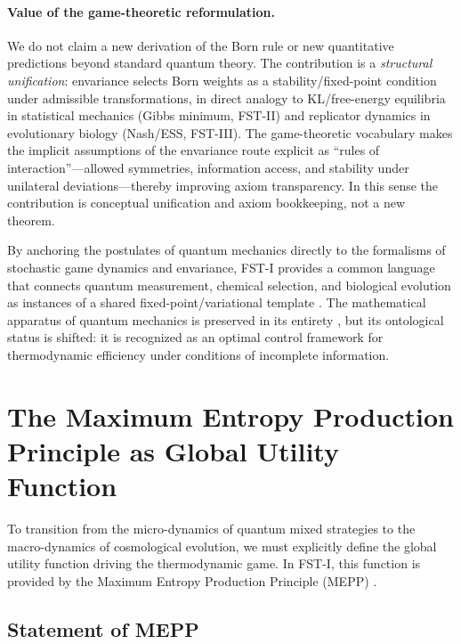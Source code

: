 \documentclass[12pt,a4paper]{article}
\theoremstyle{remark}
\begin{document}
\paragraph{Value of the game-theoretic reformulation.}
We do not claim a new derivation of the Born rule or new quantitative predictions beyond standard quantum theory. The contribution is a \emph{structural unification}: envariance selects Born weights as a stability/fixed-point condition under admissible transformations, in direct analogy to KL/free-energy equilibria in statistical mechanics (Gibbs minimum, FST-II) and replicator dynamics in evolutionary biology (Nash/ESS, FST-III). The game-theoretic vocabulary makes the implicit assumptions of the envariance route explicit as ``rules of interaction''---allowed symmetries, information access, and stability under unilateral deviations---thereby improving axiom transparency. In this sense the contribution is conceptual unification and axiom bookkeeping, not a new theorem.

By anchoring the postulates of quantum mechanics directly to the formalisms of stochastic game dynamics and envariance, FST-I provides a common language that connects quantum measurement, chemical selection, and biological evolution as instances of a shared fixed-point/variational template \citep{SchlossFine2005}. The mathematical apparatus of quantum mechanics is preserved in its entirety \citep{QuantumOptimization}, but its ontological status is shifted: it is recognized as an optimal control framework for thermodynamic efficiency under conditions of incomplete information.

\section{The Maximum Entropy Production Principle as Global Utility Function}
\label{sec:mepp}

To transition from the micro-dynamics of quantum mixed strategies to the macro-dynamics of cosmological evolution, we must explicitly define the global utility function driving the thermodynamic game. In FST-I, this function is provided by the Maximum Entropy Production Principle (MEPP) \citep{MEPP2004}.

\subsection{Statement of MEPP}
\end{document}
